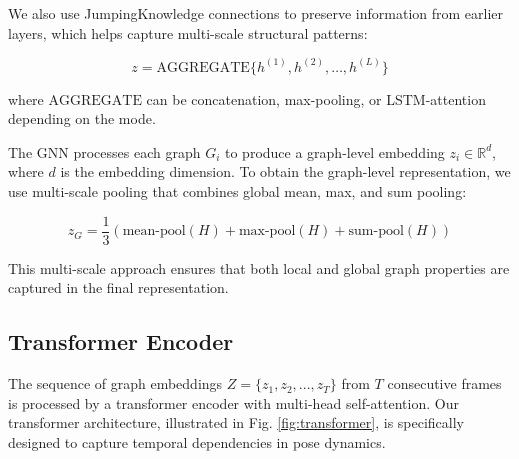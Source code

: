 \documentclass[conference]{IEEEtran}
\begin{document}
We also use JumpingKnowledge connections \cite{xu2018representation} to
preserve information from earlier layers, which helps capture multi-scale
structural patterns:

\begin{equation}
    z = \text{AGGREGATE}\{h^{(1)}, h^{(2)}, \ldots, h^{(L)}\}
\end{equation}

where $\text{AGGREGATE}$ can be concatenation, max-pooling, or LSTM-attention
depending on the mode.

The GNN processes each graph $G_i$ to produce a graph-level embedding $z_i \in
    \mathbb{R}^d$, where $d$ is the embedding dimension. To obtain the graph-level
representation, we use multi-scale pooling that combines global mean, max, and
sum pooling:

\begin{equation}
    z_G = \frac{1}{3}\left(\text{mean-pool}(H) + \text{max-pool}(H) + \text{sum-pool}(H)\right)
\end{equation}

This multi-scale approach ensures that both local and global graph properties
are captured in the final representation.

\subsection{Transformer Encoder}
The sequence of graph embeddings $Z = \{z_1, z_2, ..., z_T\}$ from $T$
consecutive frames is processed by a transformer encoder with multi-head
self-attention. Our transformer architecture, illustrated in Fig.
\ref{fig:transformer}, is specifically designed to capture temporal
dependencies in pose dynamics.
\end{document}
